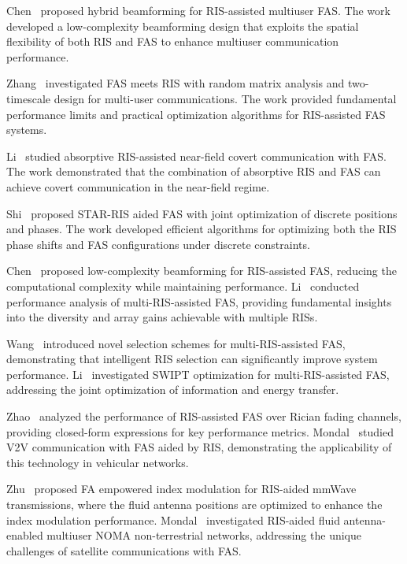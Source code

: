 Chen~\cite{chen2025hybrid} proposed hybrid beamforming for RIS-assisted multiuser FAS. The work developed a low-complexity beamforming design that exploits the spatial flexibility of both RIS and FAS to enhance multiuser communication performance.

Zhang~\cite{zhang2025ris} investigated FAS meets RIS with random matrix analysis and two-timescale design for multi-user communications. The work provided fundamental performance limits and practical optimization algorithms for RIS-assisted FAS systems.

Li~\cite{li2026absorptive} studied absorptive RIS-assisted near-field covert communication with FAS. The work demonstrated that the combination of absorptive RIS and FAS can achieve covert communication in the near-field regime.

Shi~\cite{shi2026star} proposed STAR-RIS aided FAS with joint optimization of discrete positions and phases. The work developed efficient algorithms for optimizing both the RIS phase shifts and FAS configurations under discrete constraints.

Chen~\cite{chen2024lowcomplexity} proposed low-complexity beamforming for RIS-assisted FAS, reducing the computational complexity while maintaining performance. Li~\cite{li2024performance} conducted performance analysis of multi-RIS-assisted FAS, providing fundamental insights into the diversity and array gains achievable with multiple RISs.

Wang~\cite{wang2025novel} introduced novel selection schemes for multi-RIS-assisted FAS, demonstrating that intelligent RIS selection can significantly improve system performance. Li~\cite{li2026swipt} investigated SWIPT optimization for multi-RIS-assisted FAS, addressing the joint optimization of information and energy transfer.

Zhao~\cite{zhao2026rician} analyzed the performance of RIS-assisted FAS over Rician fading channels, providing closed-form expressions for key performance metrics. Mondal~\cite{mondal2026v2v} studied V2V communication with FAS aided by RIS, demonstrating the applicability of this technology in vehicular networks.

Zhu~\cite{zhu2025fa} proposed FA empowered index modulation for RIS-aided mmWave transmissions, where the fluid antenna positions are optimized to enhance the index modulation performance. Mondal~\cite{mondal2026ris} investigated RIS-aided fluid antenna-enabled multiuser NOMA non-terrestrial networks, addressing the unique challenges of satellite communications with FAS.

